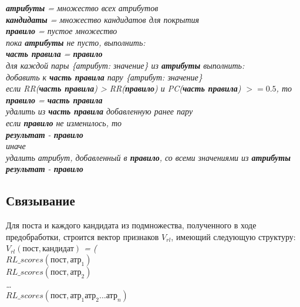 \noindent 
\textit{\textbf{атрибуты} = множество всех атрибутов\\
\textbf{кандидаты} = множество кандидатов для покрытия\\
\textbf{правило} = пустое множество\\
пока \textbf{атрибуты} не пусто, выполнить:\\
\-\hspace{1cm}	\textbf{часть правила} = \textbf{правило}\\
\-\hspace{1cm}	для каждой пары \{атрибут: значение\} из \textbf{атрибуты} выполнить:\\
\-\hspace{2cm}	добавить к \textbf{часть правила} пару \{атрибут: значение\}\\
\-\hspace{2cm}	если RR(\textbf{часть правила}) > RR(\textbf{правило}) и PC(\textbf{часть правила}) $>= 0.5$, то\\
\-\hspace{3cm}	\textbf{правило} = \textbf{часть правила}\\
\-\hspace{2cm}	удалить из \textbf{часть правила} добавленную ранее пару\\
\-\hspace{1cm}	если \textbf{правило} не изменилось, то\\
\-\hspace{2cm}	\textbf{результат} - \textbf{правило}\\
\-\hspace{1cm}	иначе\\
\-\hspace{2cm}	удалить атрибут, добавленный в \textbf{правило}, со всеми значениями из \textbf{атрибуты}\\
\textbf{результат} - \textbf{правило}\\
} %


\subsection{Связывание}

Для поста и каждого кандидата из подмножества, полученного в ходе предобработки, строится вектор признаков $V_{rl}$, имеющий следующую структуру:\\

\noindent
\textit{$V_{rl}(\text{пост}, \text{кандидат})$ = (\\
\-\hspace{1cm}	$RL\_scores(\text{пост}, \text{атр}_1)$\\
\-\hspace{1cm}	$RL\_scores(\text{пост}, \text{атр}_2)$\\
\-\hspace{1cm}	\ldots\\
\-\hspace{1cm}	$RL\_scores(\text{пост}, \text{атр}_1 \text{атр}_2 \ldots\text{атр}_n)$\\
} %

